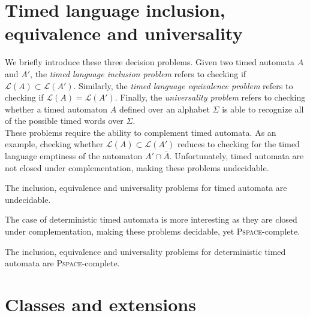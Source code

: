 
\section{Timed language inclusion, equivalence and universality}


We briefly introduce these three decision problems.
%
Given two timed automata $A$ and $A'$, the \emph{timed language inclusion problem} refers to checking if $\mathcal{L}(A) \subset \mathcal{L}(A')$. Similarly, the \emph{timed language equivalence problem} refers to checking if $\mathcal{L}(A) = \mathcal{L}(A')$. Finally, the \emph{universality problem} refers to checking whether a timed automaton $A$ defined over an alphabet $\Sigma$ is able to recognize all of the possible timed words over $\Sigma$.\\

These problems require the ability to complement timed automata. As an example, checking whether $\mathcal{L}(A) \subset \mathcal{L}(A')$ reduces to checking for the timed language emptiness of the automaton $A' \cap \overline{A}$. Unfortunately, timed automata are not closed under complementation, making these problems undecidable.

\begin{theorem} \cite{RADLD94}
  
The inclusion, equivalence and universality problems for timed automata are undecidable.

\end{theorem}

The case of deterministic timed automata is more interesting as they are closed under complementation, making these problems decidable, yet \textsc{Pspace}-complete.

\begin{theorem} \cite{RADLD94}

The inclusion, equivalence and universality problems for deterministic timed automata are \textsc{Pspace}-complete.

\end{theorem}


\section{Classes and extensions}

